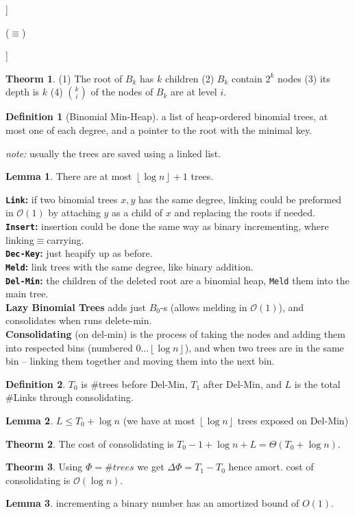 \documentclass[]{article}
\theoremstyle{definition}
\newtheorem{Theorem}{\color{theoColor}Theorm}
\newtheorem{Definition}{\color{defiColor}Definition}
\newtheorem{Lemma}{\color{lemColor}Lemma}
\newcommand\theo  [1] {\begin{Theorem}#1\end{Theorem}}
\newcommand\defi  [1] {\begin{Definition}#1\end{Definition}}
\newcommand\lem   [1] {\begin{Lemma}#1\end{Lemma}}
\newcommand\oc    {\mathcal{O}}
\newcommand\rf    {\right\rfloor}
\newcommand\lf    {\left\lfloor}
\newcommand\floor [1] {\lf #1 \rf}
\newcommand\Dg        {\Delta}
\newcommand\logn      {\log n}
\begin{document}
\begin{multicols}{4}
{				\hfil \begin{forest}
						[$\cdot$
							[$B_0$]
							[$B_1$]
							[$\cdots$]
							[$B_{k - 1}$]
						]
				\end{forest} ($\equiv$) \begin{forest}
					[$B_{k - 1}$
						[,no edge]
						[$B_{k - 1}$]
					]
				\end{forest}}
				\vspace{36pt}
				\theo{(1) The root of $B_k$ has $k$ children (2) $B_k$ contain $2^{k}$ nodes (3) its depth is $k$ (4) $\binom{k}{i}$ of the nodes of $B_k$ are at level $i$. }
				\begin{Definition}[Binomial Min-Heap]
					a list of heap-ordered binomial trees, at most one of each degree, and a pointer to the root with the minimal key. 
				\end{Definition}
				\textit{note: }usually the trees are saved using a linked list. 
				\lem{There are at most $\floor{\logn} + 1$ trees. }
				\textbf{\texttt{Link}: }if two binomial trees $x, y$ has the same degree, linking could be preformed in $\oc(1)$ by attaching $y$ as a child of $x$ and replacing the roots if needed. \\
				\textbf{\texttt{Insert}: }insertion could be done the same way as binary incrementing, where linking$\equiv$carrying. \\
				\textbf{\texttt{Dec-Key}: }just heapify up as before. \\
				\textbf{\texttt{Meld}: }link trees with the same degree, like binary addition. \\
				\textbf{\texttt{Del-Min}: }the children of the deleted root are a binomial heap, \texttt{Meld} them into the main tree. \\
				\textbf{Lazy Binomial Trees} adds just $B_0$-s (allows melding in $\oc(1)$), and consolidates when runs delete-min. \\
				\textbf{Consolidating} (on del-min) is the process of taking the nodes and adding them into respected bins (numbered $0 \dots \floor{\logn}$), and when two trees are in the same bin -- linking them together and moving them into the next bin. 
				\defi{$T_0$ is $\#$trees before Del-Min, $T_1$ after Del-Min, and $L$ is the total $\#$Links through consolidating. }
				\lem{$L \le T_0 + \logn$ (we have at most $\floor{\logn}$ trees exposed on Del-Min)}
				\theo{The cost of consolidating is $T_0 - 1 + \logn + L = \Theta(T_0 + \logn)$. }
				\theo{Using $\Phi = \# trees$ we get $\Dg \Phi = T_1 - T_0$ hence amort. cost of consolidating is $\oc(\logn)$. }
				\lem{incrementing a binary number has an amortized bound of $O(1)$. }
			

\end{multicols}
\end{document}
